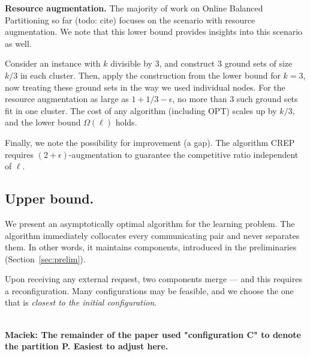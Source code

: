 \documentclass[manuscript,screen=true, review, anonymous]{acmart}
\newcommand{\OPT}{\textsf{OPT}\xspace}
\newcommand\maciek[1]{\color{brown}\textbf{\\ Maciek: #1}\color{black}}
\begin{document}
\noindent
\textbf{Resource augmentation.}
The majority of work on Online Balanced Partitioning so far (todo: cite) focuses on the scenario with resource augmentation.
We note that this lower bound provides insights into this scenario as well.

Consider an instance with $k$ divisible by $3$, and construct $3$ ground sets of size $k/3$ in each cluster.
Then, apply the construction from the lower bound for $k=3$, now treating these ground sets in the way we used individual nodes.
For the resource augmentation as large as $1+1/3-\epsilon$, no more than $3$ such ground sets fit in one cluster.
The cost of any algorithm (including \OPT) scales up by $k/3$, and the lower bound $\Omega(\ell)$ holds.

Finally, we note the possibility for improvement (a gap). The algorithm CREP~\cite{repartition-disc} requires $(2+\epsilon)$-augmentation to guarantee the competitive ratio independent of $\ell$.

\subsection{Upper bound.}
\label{sec:ppl}

We present an asymptotically optimal algorithm for the learning problem.
The algorithm immediately collocates every communicating pair and never separates them.
In other words, it maintains components, introduced in the preliminaries (Section~\ref{sec:prelim}).

Upon receiving any external request, two components merge --- and this requires a reconfiguration.
Many configurations may be feasible, and we choose the one that is \emph{closest to the initial configuration}.

\maciek{The remainder of the paper used "configuration C" to denote the partition P. Easiest to adjust here.}
\end{document}
